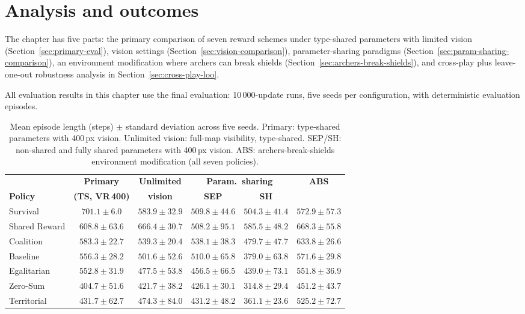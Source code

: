 \chapter{Analysis and outcomes}
\label{chap:analysis}

The chapter has five parts: the primary comparison of seven reward schemes under type-shared parameters with limited vision (Section~\ref{sec:primary-eval}), vision settings (Section~\ref{sec:vision-comparison}), parameter-sharing paradigms (Section~\ref{sec:param-sharing-comparison}), an environment modification where archers can break shields (Section~\ref{sec:archers-break-shields}), and cross-play plus leave-one-out robustness analysis in Section~\ref{sec:cross-play-loo}.

All evaluation results in this chapter use the final evaluation: 10\,000-update runs, five seeds per configuration, with deterministic evaluation episodes. 
\begin{table}[H]
\centering
\small
\setlength{\tabcolsep}{5pt}
\begin{tabular}{@{}l c c c c c@{}}
\toprule
 & \textbf{Primary} & \textbf{Unlimited} & \multicolumn{2}{c}{\textbf{Param.\ sharing}} & \textbf{ABS} \\
\cmidrule(lr){4-5}
\textbf{Policy} & \textbf{(TS, VR\,400)} & \textbf{vision} & \textbf{SEP} & \textbf{SH} & \\
\midrule
Survival      & $701.1 \pm 6.0$   & $583.9 \pm 32.9$ & $509.8 \pm 44.6$ & $504.3 \pm 41.4$ & $572.9 \pm 57.3$ \\
Shared Reward & $608.8 \pm 63.6$  & $666.4 \pm 30.7$ & $508.2 \pm 95.1$ & $585.5 \pm 48.2$ & $668.3 \pm 55.8$ \\
Coalition     & $583.3 \pm 22.7$  & $539.3 \pm 20.4$ & $538.1 \pm 38.3$ & $479.7 \pm 47.7$ & $633.8 \pm 26.6$ \\
Baseline      & $556.3 \pm 28.2$  & $501.6 \pm 52.6$ & $510.0 \pm 65.8$ & $379.0 \pm 63.8$ & $571.6 \pm 29.8$ \\
Egalitarian   & $552.8 \pm 31.9$  & $477.5 \pm 53.8$ & $456.5 \pm 66.5$ & $439.0 \pm 73.1$ & $551.8 \pm 36.9$ \\
Zero-Sum      & $404.7 \pm 51.6$  & $421.7 \pm 38.2$ & $426.1 \pm 30.1$ & $314.8 \pm 29.4$ & $451.2 \pm 43.7$ \\
Territorial   & $431.7 \pm 62.7$  & $474.3 \pm 84.0$ & $431.2 \pm 48.2$ & $361.1 \pm 23.6$ & $525.2 \pm 72.7$ \\
\bottomrule
\end{tabular}
\caption[Episode length across configurations]{Mean episode length (steps) $\pm$ standard deviation across five seeds. Primary: type-shared parameters with 400\,px vision. Unlimited vision: full-map visibility, type-shared. SEP/SH: non-shared and fully shared parameters with 400\,px vision. ABS: archers-break-shields environment modification (all seven policies).}
\label{tab:episode-length-summary}
\end{table}


